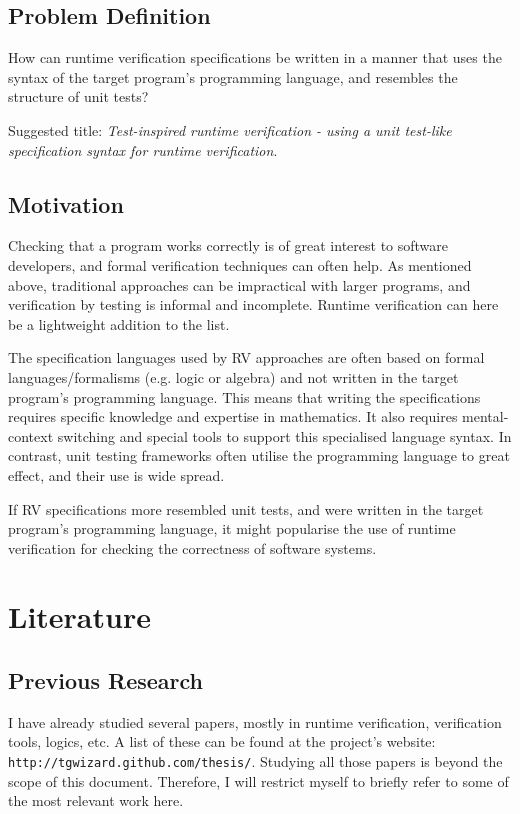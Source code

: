 \documentclass[a4paper,11pt]{article}
\begin{document}
\subsection{Problem Definition}

How can runtime verification specifications be written in a manner that uses the syntax of
the target program's programming language, and resembles the structure of unit tests?

Suggested title: \textit{Test-inspired runtime verification - using a unit test-like specification syntax for runtime verification}.


\subsection{Motivation}

Checking that a program works correctly is of great interest to software developers, and
formal verification techniques can often help. As mentioned above, traditional approaches
can be impractical with larger programs, and verification by testing is
informal and incomplete.
Runtime verification can here be a lightweight addition to the list.

The specification languages used by RV approaches are often based
on formal languages/formalisms (e.g. logic or algebra) and not written in the target program's programming language. 
This means that writing the specifications requires specific knowledge and expertise in mathematics. 
It also requires mental-context switching and special tools
to support this specialised language syntax. In contrast, unit testing frameworks often
utilise the programming language to great effect, and their use is wide spread.

If RV specifications more resembled unit tests, and were written in the target program's
programming language, it might popularise the use of runtime verification for
checking the correctness of software systems.


\section{Literature}

\subsection{Previous Research}

I have already studied several papers, mostly in runtime verification, verification tools, logics, etc.
A list of these can be found at the project's website: \texttt{http://tgwizard.github.com/thesis/}.
Studying all those papers is beyond the scope of this document. Therefore, I will restrict myself to briefly refer to some of the most relevant work here.
\end{document}
